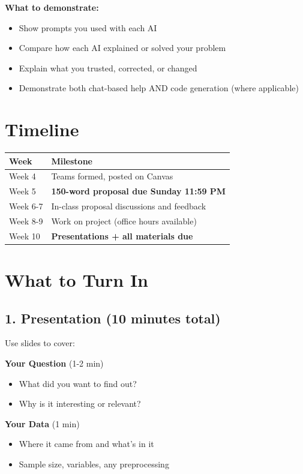 \documentclass[11pt]{article}
\begin{document}
\textbf{What to demonstrate:}
\begin{itemize}
\item Show prompts you used with each AI
\item Compare how each AI explained or solved your problem
\item Explain what you trusted, corrected, or changed
\item Demonstrate both chat-based help AND code generation (where applicable)
\end{itemize}

\section{Timeline}

\begin{center}
\begin{tabular}{ll}
\toprule
\textbf{Week} & \textbf{Milestone} \\
\midrule
Week 4 & Teams formed, posted on Canvas \\
Week 5 & \textbf{150-word proposal due Sunday 11:59 PM} \\
Week 6-7 & In-class proposal discussions and feedback \\
Week 8-9 & Work on project (office hours available) \\
Week 10 & \textbf{Presentations + all materials due} \\
\bottomrule
\end{tabular}
\end{center}

\section{What to Turn In}

\subsection{1. Presentation (10 minutes total)}

Use slides to cover:

\textbf{Your Question} (1-2 min)
\begin{itemize}
\item What did you want to find out?
\item Why is it interesting or relevant?
\end{itemize}

\textbf{Your Data} (1 min)
\begin{itemize}
\item Where it came from and what's in it
\item Sample size, variables, any preprocessing
\end{itemize}
\end{document}
